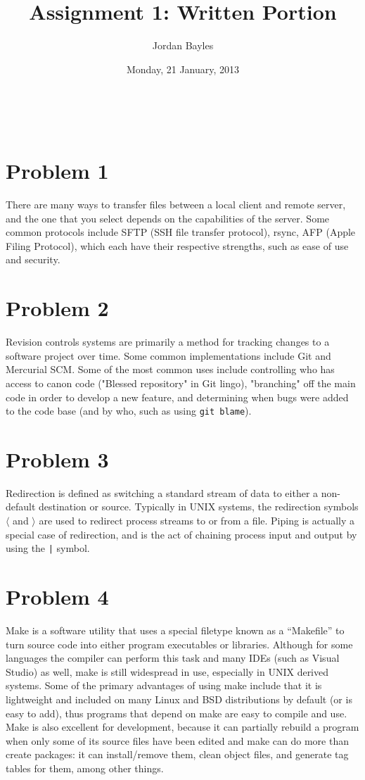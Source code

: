 \documentclass[12pt,letterpaper]{article}
\author{Jordan Bayles}
\title{Assignment 1: Written Portion}
\date{Monday, 21 January, 2013}
\makeatletter
\let\thetitle\@title
\let\theauthor\@author
\let\thedate\@date
\makeatother
\begin{document}
\begin{flushright}
\theauthor\\
\thedate
\end{flushright}
\begin{center}
\thetitle
\end{center}
% 
%

\section*{Problem 1}
There are many ways to transfer files between a local client and remote server,
and the one that you select depends on the capabilities of the server. Some
common protocols include
SFTP (SSH file transfer protocol), rsync, AFP (Apple Filing Protocol), which
each have their respective strengths, such as ease of use and security.

\section*{Problem 2}
Revision controls systems are primarily a method for tracking changes to
a software project over time. Some common implementations include Git and
Mercurial SCM. Some of the most common uses include controlling who has
access to canon code ("Blessed repository" in Git lingo), "branching" off
the main code in order to develop a new feature, and determining when bugs
were added to the code base (and by who, such as using \verb!git blame!).

\section*{Problem 3}
Redirection is defined as switching a standard stream of data to either a
non-default destination or source. Typically in UNIX systems, the redirection
symbols $\langle$ and $\rangle$ are used to redirect process streams to
or from a file. Piping is actually a special case of redirection, and is the
act of chaining process input and output by using the \verb!|! symbol.

\section*{Problem 4}
Make is a software utility that uses a special filetype known as a ``Makefile''
to turn source code into either program executables or libraries. Although for
some languages the compiler can perform this task and many IDEs (such as
Visual Studio) as well, make is still widespread in use, especially in UNIX
derived systems. Some of the primary advantages of using make include that it
is lightweight and included on many Linux and BSD distributions by default (or
is easy to add), thus programs that depend on make are easy to compile and use.
Make is also excellent for development, because it can partially rebuild a program
when only some of its source files have been edited and make can do more than create
packages: it can install/remove them, clean object files, and generate tag
tables for them, among other things.
\end{document}
